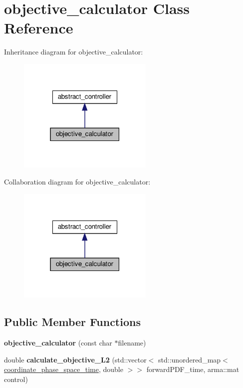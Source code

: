 \hypertarget{classobjective__calculator}{}\section{objective\+\_\+calculator Class Reference}
\label{classobjective__calculator}


Inheritance diagram for objective\+\_\+calculator\+:\nopagebreak
\begin{figure}[H]
\begin{center}
\leavevmode
\includegraphics[width=183pt]{classobjective__calculator__inherit__graph}
\end{center}
\end{figure}


Collaboration diagram for objective\+\_\+calculator\+:\nopagebreak
\begin{figure}[H]
\begin{center}
\leavevmode
\includegraphics[width=183pt]{classobjective__calculator__coll__graph}
\end{center}
\end{figure}
\subsection*{Public Member Functions}
\begin{DoxyCompactItemize}
\item 
\mbox{\label{classobjective__calculator_ac0122306f4282be07f42f38d761a4bff}} 
{\bfseries objective\+\_\+calculator} (const char $\ast$filename)
\item 
\mbox{\label{classobjective__calculator_ac0d0237d5f738a90abc4492220134784}} 
double {\bfseries calculate\+\_\+objective\+\_\+\+L2} (std\+::vector$<$ std\+::unordered\+\_\+map$<$ \hyperlink{classcoordinate__phase__space__time}{coordinate\+\_\+phase\+\_\+space\+\_\+time}, double $>$$>$ forward\+P\+D\+F\+\_\+time, arma\+::mat control)
\end{DoxyCompactItemize}


